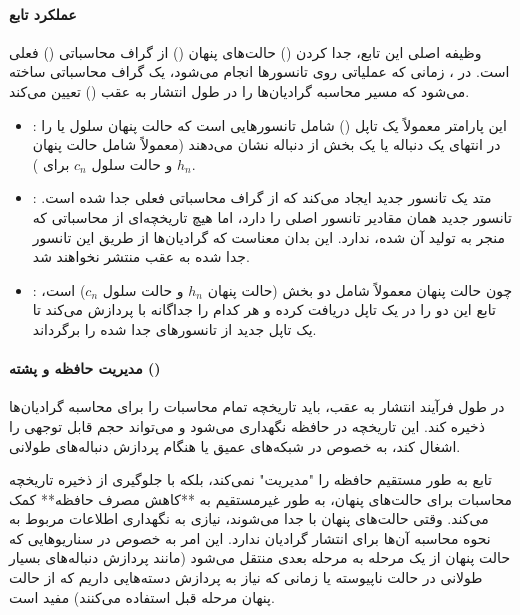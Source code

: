 \documentclass{article}
\begin{document}
\paragraph{عملکرد تابع }
وظیفه اصلی این تابع، جدا کردن () حالت‌های پنهان () از گراف محاسباتی () فعلی است. در ، زمانی که عملیاتی روی تانسورها انجام می‌شود، یک گراف محاسباتی ساخته می‌شود که مسیر محاسبه گرادیان‌ها را در طول انتشار به عقب () تعیین می‌کند.
\begin{itemize}
	\item {}: این پارامتر معمولاً یک تاپل () شامل تانسورهایی است که حالت پنهان سلول  یا  را در انتهای یک دنباله یا یک بخش از دنباله نشان می‌دهند (معمولاً شامل حالت پنهان \(h_n\) و حالت سلول \(c_n\) برای ).
	\item {}: متد  یک تانسور جدید ایجاد می‌کند که از گراف محاسباتی فعلی جدا شده است. تانسور جدید همان مقادیر تانسور اصلی را دارد، اما هیچ تاریخچه‌ای از محاسباتی که منجر به تولید آن شده، ندارد. این بدان معناست که گرادیان‌ها از طریق این تانسور جدا شده به عقب منتشر نخواهند شد.
	\item {}: چون حالت پنهان  معمولاً شامل دو بخش (حالت پنهان \(h_n\) و حالت سلول \(c_n\)) است، تابع این دو را در یک تاپل دریافت کرده و هر کدام را جداگانه با  پردازش می‌کند تا یک تاپل جدید از تانسورهای جدا شده را برگرداند.
\end{itemize}

\paragraph{مدیریت حافظه و پشته ()}
در طول فرآیند انتشار به عقب،  باید تاریخچه تمام محاسبات را برای محاسبه گرادیان‌ها ذخیره کند. این تاریخچه در حافظه  نگهداری می‌شود و می‌تواند حجم قابل توجهی را اشغال کند، به خصوص در شبکه‌های عمیق یا هنگام پردازش دنباله‌های طولانی.

تابع  به طور مستقیم حافظه  را "مدیریت" نمی‌کند، بلکه با جلوگیری از ذخیره تاریخچه محاسبات برای حالت‌های پنهان، به طور غیرمستقیم به **کاهش مصرف حافظه** کمک می‌کند. وقتی حالت‌های پنهان با  جدا می‌شوند،  نیازی به نگهداری اطلاعات مربوط به نحوه محاسبه آن‌ها برای انتشار گرادیان ندارد. این امر به خصوص در سناریوهایی که حالت پنهان از یک مرحله به مرحله بعدی منتقل می‌شود (مانند پردازش دنباله‌های بسیار طولانی در حالت ناپیوسته یا زمانی که نیاز به پردازش دسته‌هایی داریم که از حالت پنهان مرحله قبل استفاده می‌کنند) مفید است.
\end{document}
